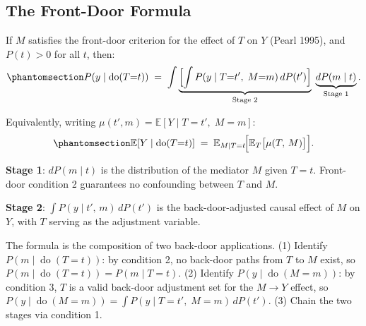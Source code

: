\documentclass[
  a4paper,
]{book}
\newcommand{\doop}{\operatorname{do}}
\newcommand{\E}{\mathbb{E}}
\begin{document}
\subsection{The Front-Door Formula}\label{the-front-door-formula}

\begin{tcolorbox}[enhanced jigsaw, arc=.35mm, bottomrule=.15mm, bottomtitle=1mm, breakable, colback=white, colbacktitle=quarto-callout-tip-color!10!white, colframe=quarto-callout-tip-color-frame, coltitle=black, left=2mm, leftrule=.75mm, opacityback=0, opacitybacktitle=0.6, rightrule=.15mm, title={Theorem: Front-Door Adjustment Formula}, titlerule=0mm, toprule=.15mm, toptitle=1mm]

If \(M\) satisfies the front-door criterion for the effect of \(T\) on
\(Y\) (Pearl 1995), and \(P(t) > 0\) for all \(t\), then:
\begin{equation}\protect\phantomsection\label{eq-frontdoor}{P\!\left(y \mid \doop(T{=}t)\right) \;=\; \int \underbrace{\Bigl[\int P(y \mid T{=}t',\;M{=}m)\,dP(t')\Bigr]}_{\text{Stage 2}} \;\underbrace{dP(m \mid t)}_{\text{Stage 1}}.}\end{equation}

Equivalently, writing \(\mu(t',m) = \E[Y \mid T{=}t',\;M{=}m]\):
\begin{equation}\protect\phantomsection\label{eq-frontdoor-exp}{\E\!\left[Y \mid \doop(T{=}t)\right] \;=\; \E_{M \mid T=t}\!\Bigl[\E_T\bigl[\mu(T,\,M)\bigr]\Bigr].}\end{equation}

\textbf{Stage 1}: \(dP(m \mid t)\) is the distribution of the mediator
\(M\) given \(T{=}t\). Front-door condition 2 guarantees no confounding
between \(T\) and \(M\).

\textbf{Stage 2}: \(\int P(y \mid t',\,m)\,dP(t')\) is the
back-door-adjusted causal effect of \(M\) on \(Y\), with \(T\) serving
as the adjustment variable.

\end{tcolorbox}

The formula is the composition of two back-door applications. (1)
Identify \(P(m \mid \doop(T{=}t))\): by condition 2, no back-door paths
from \(T\) to \(M\) exist, so
\(P(m \mid \doop(T{=}t)) = P(m \mid T{=}t)\). (2) Identify
\(P(y \mid \doop(M{=}m))\): by condition 3, \(T\) is a valid back-door
adjustment set for the \(M \to Y\) effect, so
\(P(y \mid \doop(M{=}m)) = \int P(y \mid T{=}t',\;M{=}m)\,dP(t')\). (3)
Chain the two stages via condition 1.
\end{document}
